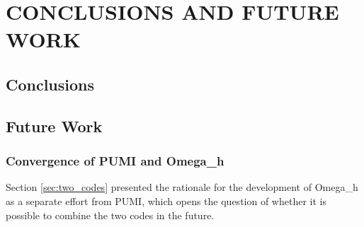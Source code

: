 
\chapter{CONCLUSIONS AND FUTURE WORK}

\section{Conclusions}

\section{Future Work}

\subsection{Convergence of PUMI and Omega\_h}

Section \ref{sec:two_codes} presented the rationale
for the development of Omega\_h as a separate effort from PUMI,
which opens the question of whether it is possible
to combine the two codes in the future.

